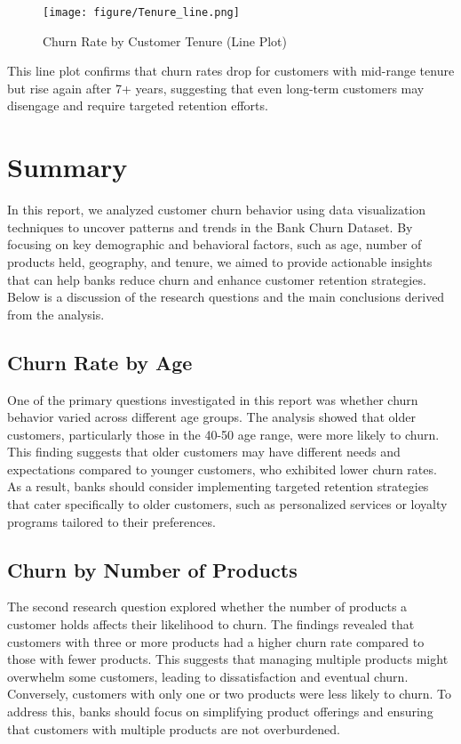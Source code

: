\documentclass[12pt]{article}
\begin{document}
\begin{enumerate}
  \begin{figure}[h] %
    \centering
    \texttt{[image: figure/Tenure\_line.png]} %
    \caption{Churn Rate by Customer Tenure (Line Plot)} %
    \label{fig:churn_rate_by_tenure} %
\end{figure}

    
    This line plot confirms that churn rates drop for customers with mid-range tenure but rise again after 7+ years, suggesting that even long-term customers may disengage and require targeted retention efforts.
\end{enumerate}

\newpage
\section{Summary}
In this report, we analyzed customer churn behavior using data visualization techniques to uncover patterns and trends in the Bank Churn Dataset. By focusing on key demographic and behavioral factors, such as age, number of products held, geography, and tenure, we aimed to provide actionable insights that can help banks reduce churn and enhance customer retention strategies. Below is a discussion of the research questions and the main conclusions derived from the analysis.

\subsection{Churn Rate by Age}
One of the primary questions investigated in this report was whether churn behavior varied across different age groups. The analysis showed that older customers, particularly those in the 40-50 age range, were more likely to churn. This finding suggests that older customers may have different needs and expectations compared to younger customers, who exhibited lower churn rates. As a result, banks should consider implementing targeted retention strategies that cater specifically to older customers, such as personalized services or loyalty programs tailored to their preferences.

\subsection{Churn by Number of Products}
The second research question explored whether the number of products a customer holds affects their likelihood to churn. The findings revealed that customers with three or more products had a higher churn rate compared to those with fewer products. This suggests that managing multiple products might overwhelm some customers, leading to dissatisfaction and eventual churn. Conversely, customers with only one or two products were less likely to churn. To address this, banks should focus on simplifying product offerings and ensuring that customers with multiple products are not overburdened.
\end{document}
